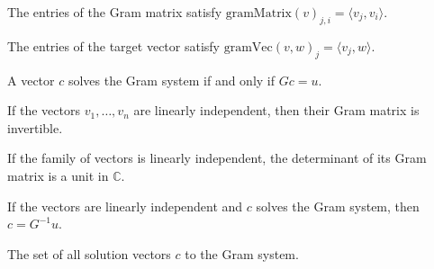 \begin{theorem}\label{thm:gramMatrix_apply}
  \leanok
  The entries of the Gram matrix satisfy $\text{gramMatrix}(v)_{j, i} = \langle v_j, v_i \rangle$.
\end{theorem}

\begin{theorem}\label{thm:gramVec_apply}
  \leanok
  The entries of the target vector satisfy $\text{gramVec}(v, w)_j = \langle v_j, w \rangle$.
\end{theorem}

\begin{theorem}\label{thm:isGramSolution_iff_mulVec}
  \leanok
  A vector $c$ solves the Gram system if and only if $G c = u$.
\end{theorem}

\begin{theorem}\label{thm:gramMatrix_det_ne_zero}
  \leanok
  If the vectors $v_1, \dots, v_n$ are linearly independent, then their Gram matrix is invertible.
\end{theorem}

\begin{theorem}\label{thm:gramMatrix_isUnit_det}
  \leanok
  If the family of vectors is linearly independent, the determinant of its Gram matrix is a unit in $\mathbb{C}$.
\end{theorem}

{\chat
\begin{theorem}\label{thm:gram_solution_eq_inv}
  \leanok
  If the vectors are linearly independent and $c$ solves the Gram system, then $c = G^{-1} u$.
\end{theorem}
} %

\begin{definition}\label{def:gramSolutionSet}
  \leanok
  The set of all solution vectors $c$ to the Gram system.
\end{definition}

